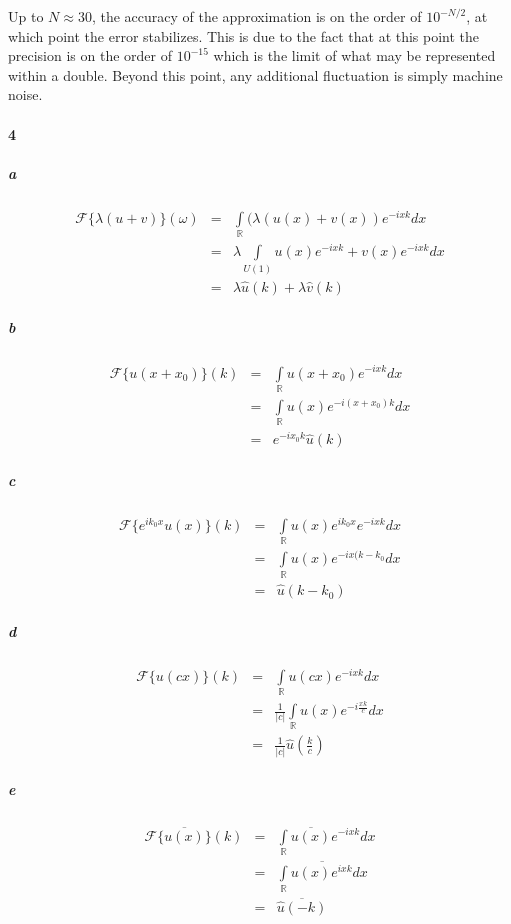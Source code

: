 \documentclass{article}
\begin{document}
Up to $N \approx 30$, the accuracy of the approximation is on the order of $10^{-N/2}$, at which point the error stabilizes.  This is due to the fact that at this point the precision is on the order of $10^{-15}$ which is the limit of what may be represented within a double.  Beyond this point, any additional fluctuation is simply machine noise.

\paragraph{4}

\subparagraph{a}
\begin{eqnarray*}
\mathcal{F}\{ \lambda(u + v) \}( \omega ) & = & \int \limits_{\mathbb{R}} (\lambda(u(x) + v(x)) e^{-i x k} d x \\
& = & \lambda \int \limits_{U(1)} u(x) e^{-i x k} + v(x) e^{-i x k} dx \\
& = & \lambda \hat{u}(k) + \lambda \hat{v}(k)
\end{eqnarray*}

\subparagraph{b}
\begin{eqnarray*}
\mathcal{F}\{ u(x+x_0) \}(k) &= & \int \limits_{ \mathbb{R} } u(x+x_0) e^{-i x k} d x \\
 & = & \int \limits_{\mathbb{R} } u(x) e^{-i (x + x_0) k} dx \\
 & = & e^{-i x_0 k} \hat{u}(k)
\end{eqnarray*}

\subparagraph{c}
\begin{eqnarray*}
\mathcal{F}\{ e^{i k_0 x}u(x) \}(k) &= & \int \limits_{ \mathbb{R} } u(x) e^{i k_0 x} e^{-i x k} d x \\
 & = & \int \limits_{\mathbb{R} } u(x) e^{-i x (k - k_0} dx \\
 & = & \hat{u}(k - k_0)
\end{eqnarray*}

\subparagraph{d}
\begin{eqnarray*}
\mathcal{F}\{u(cx)\} (k) & = & \int \limits_\mathbb{R} u(c x) e^{-i x k} d x \\
& = & \frac{1}{|c|} \int \limits_{\mathbb{R}} u(x) e^{-i \frac{x k}{c} } dx \\
& = & \frac{1}{|c|} \hat{u}(\frac{k}{c})
\end{eqnarray*}

\subparagraph{e}
\begin{eqnarray*}
\mathcal{F} \{ \overline{u(x)} \} (k) & = & \int \limits_\mathbb{R} \overline{u(x)} e^{-i x k} d x\\
& = & \overline{ \int \limits_\mathbb{R} u(x) e^{i x k} dx } \\
& = & \overline{ \hat{u}(-k) }
\end{eqnarray*}
\end{document}
